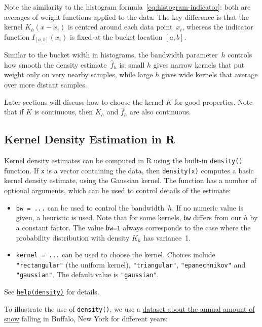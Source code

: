 \documentclass[
  a4paper,
]{article}
\theoremstyle{definition}
\theoremstyle{definition}
\theoremstyle{definition}
\theoremstyle{definition}
\theoremstyle{remark}
\begin{document}
Note the similarity to the histogram formula~\eqref{eq:histogram-indicator}:
both are averages of weight functions applied to the data.
The key difference is that the kernel \(K_h(x - x_i)\) is centred around each
data point~\(x_i\), whereas the indicator function \(I_{[a,b]}(x_i)\) is fixed
at the bucket location \([a,b]\).

Similar to the bucket width in histograms, the bandwidth parameter~\(h\)
controls how smooth the density estimate~\(\hat f_h\) is: small \(h\) gives
narrow kernels that put weight only on very nearby samples, while large \(h\)
gives wide kernels that average over more distant samples.

Later sections will discuss how to choose the kernel \(K\) for good properties.
Note that if \(K\) is continuous, then \(K_h\) and \(\hat f_h\) are also continuous.

\subsection{Kernel Density Estimation in R}\label{kernel-density-estimation-in-r}

Kernel density estimates can be computed in R using the built-in
\texttt{density()} function. If \texttt{x} is a vector containing the data, then
\texttt{density(x)} computes a basic kernel density estimate, using the
Gaussian kernel. The function has a number of optional arguments,
which can be used to control details of the estimate:

\begin{itemize}
\item
  \texttt{bw\ =\ ...} can be used to control the bandwidth~\(h\).
  If no numeric value is given, a heuristic is used.
  Note that for some kernels, \texttt{bw} differs from our \(h\)
  by a constant factor. The value \texttt{bw=1} always corresponds
  to the case where the probability distribution with density
  \(K_h\) has variance~1.
\item
  \texttt{kernel\ =\ ...} can be used to choose the kernel.
  Choices include \texttt{"rectangular"} (the uniform kernel), \texttt{"triangular"},
  \texttt{"epanechnikov"} and \texttt{"gaussian"}. The default value is \texttt{"gaussian"}.
\end{itemize}

See \href{https://rdrr.io/r/stats/density.html}{\texttt{help(density)}} for details.

To illustrate the use of \texttt{density()}, we use a
\href{https://teaching.seehuhn.de/data/buffalo/}{dataset about the annual amount of snow}
falling in Buffalo, New York for different years:
\end{document}
